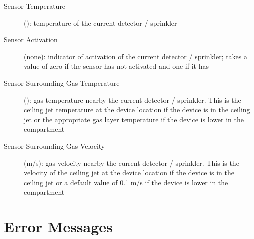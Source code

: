 \begin{description}
\item[Sensor Temperature] (\degc): temperature of the current detector / sprinkler
\item[Sensor Activation] (none): indicator of activation of the current detector / sprinkler; takes a value of zero if the sensor has not activated and one if it has
\item[Sensor Surrounding Gas Temperature] (\degc): gas temperature nearby the current detector / sprinkler. This is the ceiling jet temperature at the device location if the device is in the ceiling jet or the appropriate gas layer temperature if the device is lower in the compartment
\item[Sensor Surrounding Gas Velocity] (m/s): gas velocity nearby the current detector / sprinkler. This is the velocity of the ceiling jet at the device location if the device is in the ceiling jet or a default value of 0.1 m/s if the device is lower in the compartment
\end{description}

\newpage

\section{Error Messages}

